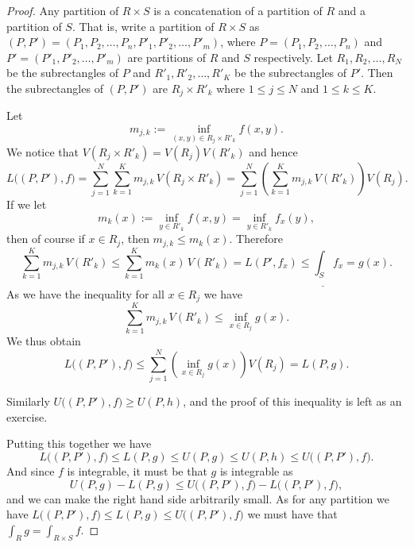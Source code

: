 \begin{proof}
Any partition of $R \times S$ is a concatenation of a partition of $R$ and a
partition of $S$.  That is, write a partition of $R \times S$
as $(P,P') = (P_1,P_2,\ldots,P_n,P'_1,P'_2,\ldots,P'_m)$,
where
$P = (P_1,P_2,\ldots,P_n)$ and
$P' = (P'_1,P'_2,\ldots,P'_m)$ are partitions of $R$ and $S$ respectively.
Let
$R_1,R_2,\ldots,R_N$ be the subrectangles of $P$ and
$R'_1,R'_2,\ldots,R'_K$ be the subrectangles of $P'$.
Then the subrectangles of $(P,P')$ are
$R_j \times R'_k$ where $1 \leq j \leq N$ and $1 \leq k \leq K$.

Let
\begin{equation*}
m_{j,k} :=
\inf_{(x,y) \in R_j \times R'_k} f(x,y) .
\end{equation*}
We notice that
$V(R_j \times R'_k) = V(R_j)V(R'_k)$ and hence
\begin{equation*}
L\bigl((P,P'),f\bigr) =
\sum_{j=1}^N
\sum_{k=1}^K
m_{j,k} \, V(R_j \times R'_k)
=
\sum_{j=1}^N
\left(
\sum_{k=1}^K
m_{j,k} \, V(R'_k) \right) V(R_j) .
\end{equation*}
If we let
\begin{equation*}
m_k(x) := \inf_{y \in R'_k} f(x,y) = \inf_{y \in R'_k} f_x(y) ,
\end{equation*}
then of course if $x \in R_j$, then $m_{j,k} \leq m_k(x)$.  Therefore
\begin{equation*}
\sum_{k=1}^K
m_{j,k} \, V(R'_k)
\leq \sum_{k=1}^K m_k(x) \, V(R'_k) = L(P',f_x) \leq
\underline{\int_S} f_x = g(x) .
\end{equation*}
As we have the inequality for all $x \in R_j$ we have
\begin{equation*}
\sum_{k=1}^K
m_{j,k} \, V(R'_k)
\leq \inf_{x \in R_j} g(x) .
\end{equation*}
We thus obtain
\begin{equation*}
L\bigl((P,P'),f\bigr) 
\leq
\sum_{j=1}^N
\left(
\inf_{x \in R_j} g(x)
\right) V(R_j) = L(P,g) .
\end{equation*}

Similarly $U\bigl((P,P'),f) \geq U(P,h)$, and the proof of this inequality is
left as an exercise.

Putting this together we have
\begin{equation*}
L\bigl((P,P'),f\bigr)
\leq
L(P,g) \leq
U(P,g) \leq
U(P,h) \leq
U\bigl((P,P'),f\bigr) .
\end{equation*}
And since $f$ is integrable, it must be that $g$ is integrable as
\begin{equation*}
U(P,g) - L(P,g)
\leq
U\bigl((P,P'),f\bigr) -
L\bigl((P,P'),f\bigr) ,
\end{equation*}
and we can make the right hand side arbitrarily small.
As for any partition we have 
$L\bigl((P,P'),f\bigr) \leq L(P,g) \leq U\bigl((P,P'),f\bigr)$ we must have
that $\int_R g = \int_{R \times S} f$.


\end{proof}
